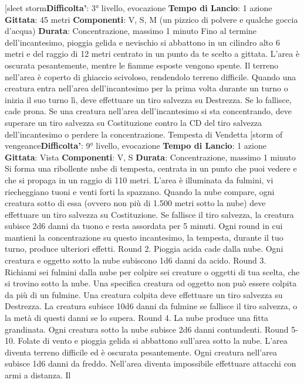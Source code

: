 \begin{multicols}{2}
[sleet storm\textbf{Difficolta'}:
3° livello, evocazione
\textbf{Tempo di Lancio}: 1 azione
\textbf{Gittata}: 45 metri
\textbf{Componenti}: V, S, M (un pizzico di polvere e qualche
goccia d’acqua)
\textbf{Durata}: Concentrazione, massimo 1 minuto
Fino al termine dell’incantesimo, pioggia gelida e
nevischio si abbattono in un cilindro alto 6 metri e del
raggio di 12 metri centrato in un punto da te scelto a
gittata. L’area è oscurata pesantemente, mentre le
fiamme esposte vengono spente.
Il terreno nell’area è coperto di ghiaccio scivoloso,
rendendolo terreno difficile. Quando una creatura entra
nell’area dell’incantesimo per la prima volta durante un
turno o inizia il suo turno lì, deve effettuare un tiro
salvezza su Destrezza. Se lo fallisce, cade prona.
Se una creatura nell’area dell’incantesimo si sta
concentrando, deve superare un tiro salvezza su
Costituzione contro la CD del tiro salvezza
dell’incantesimo o perdere la concentrazione.
Tempesta di Vendetta
[storm of vengeance\textbf{Difficolta'}:
9° livello, evocazione
\textbf{Tempo di Lancio}: 1 azione
\textbf{Gittata}: Vista
\textbf{Componenti}: V, S
\textbf{Durata}: Concentrazione, massimo 1 minuto
Si forma una ribollente nube di tempesta, centrata in un
punto che puoi vedere e che si propaga in un raggio di
110 metri. L’area è illuminata da fulmini, vi riecheggiano
tuoni e venti forti la spazzano. Quando la nube
compare, ogni creatura sotto di essa (ovvero non più di
1.500 metri sotto la nube) deve effettuare un tiro
salvezza su Costituzione. Se fallisce il tiro salvezza, la
creatura subisce 2d6 danni da tuono e resta assordata
per 5 minuti.
Ogni round in cui mantieni la concentrazione su questo
incantesimo, la tempesta, durante il tuo turno, produce
ulteriori effetti.
Round 2. Pioggia acida cade dalla nube. Ogni creatura
e oggetto sotto la nube subiscono 1d6 danni da acido.
Round 3. Richiami sei fulmini dalla nube per colpire sei
creature o oggetti di tua scelta, che si trovino sotto la
nube. Una specifica creatura od oggetto non può
essere colpita da più di un fulmine. Una creatura colpita
deve effettuare un tiro salvezza su Destrezza. La
creatura subisce 10d6 danni da fulmine se fallisce il tiro
salvezza, o la metà di questi danni se lo supera.
Round 4. La nube produce una fitta grandinata. Ogni
creatura sotto la nube subisce 2d6 danni contundenti.
Round 5-10. Folate di vento e pioggia gelida si
abbattono sull’area sotto la nube. L’area diventa terreno
difficile ed è oscurata pesantemente. Ogni creatura
nell’area subisce 1d6 danni da freddo. Nell’area diventa
impossibile effettuare attacchi con armi a distanza. Il

\end{multicols}
